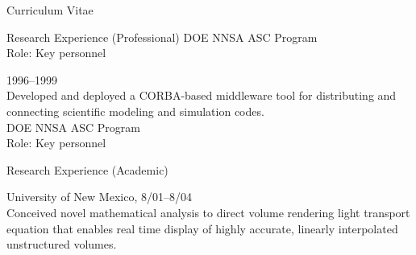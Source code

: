 \documentclass{article}
\begin{document}
\begin{cv}{Curriculum Vitae}
\begin{cvlist}{Research Experience (Professional)}
      DOE NNSA ASC Program\\
      Role: Key personnel
    \item[Product Realization Environment]\hfill 1996--1999 \\
      Developed and deployed a CORBA-based middleware tool for distributing
      and connecting scientific modeling and simulation codes.\\
      DOE NNSA ASC Program\\
      Role: Key personnel
    \end{cvlist}

    \begin{cvlist}{Research Experience (Academic)}
    \item[Doctoral Research]\hfill University of New Mexico, 8/01--8/04 \\
      Conceived novel mathematical analysis to direct volume rendering
      light transport equation that enables real time display of highly
      accurate, linearly interpolated unstructured volumes.
    \end{cvlist}


\end{cv}
\end{document}
